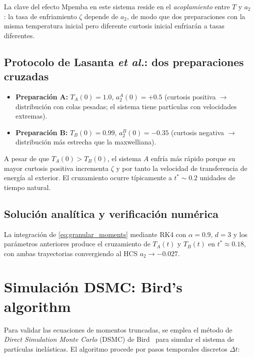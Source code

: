 La clave del efecto Mpemba en este sistema reside en el \emph{acoplamiento} 
entre $T$ y $a_2$: la tasa de enfriamiento $\zeta$ depende de $a_2$, de modo 
que dos preparaciones con la misma temperatura inicial pero diferente curtosis 
inicial enfriarán a tasas diferentes.

\subsection{Protocolo de Lasanta \emph{et al.}: dos preparaciones cruzadas}

\begin{itemize}
\item \textbf{Preparación A:} $T_A(0) = 1.0$, $a_2^{A}(0) = +0.5$ (curtosis positiva 
$\to$ distribución con colas pesadas; el sistema tiene partículas con velocidades 
extremas).
\item \textbf{Preparación B:} $T_B(0) = 0.99$, $a_2^{B}(0) = -0.35$ (curtosis 
negativa $\to$ distribución más estrecha que la maxwelliana).
\end{itemize}

\noindent A pesar de que $T_A(0) > T_B(0)$, el sistema $A$ enfría más rápido 
porque su mayor curtosis positiva incrementa $\zeta$ y por tanto la velocidad de 
transferencia de energía al exterior. El cruzamiento ocurre típicamente a 
$t^{\ast} \sim 0.2$ unidades de tiempo natural.

\subsection{Solución analítica y verificación numérica}

La integración de \cref{eq:granular_moments} mediante RK4 con $\alpha = 0.9$, 
$d = 3$ y los parámetros anteriores produce el cruzamiento de $T_A(t)$ y $T_B(t)$ 
en $t^{\ast} \approx 0.18$, con ambas trayectorias convergiendo al HCS 
$a_2 \to -0.027$.

\section{Simulación DSMC: Bird's algorithm}

Para validar las ecuaciones de momentos truncadas, se emplea el método de 
\emph{Direct Simulation Monte Carlo} (DSMC) de Bird~\cite{bird1994} para 
simular el sistema de partículas inelásticas. El algoritmo procede por pasos 
temporales discretos $\Delta t$:

